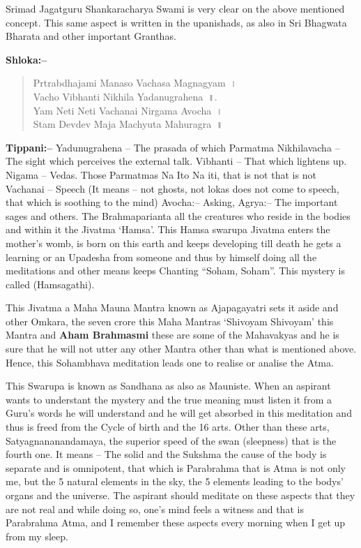 Srimad Jagatguru Shankaracharya Swami is very clear on the above mentioned concept. This same aspect is written in the upanishads, as also in Sri Bhagwata Bharata and other important Granthas.

\textbf{Shloka:–}

\begin{verse}
 Prtrabdhajami Manaso Vachasa Magnagyam~।\\
 Vacho Vibhanti Nikhila Yadanugrahena~॥.\\
 Yam Neti Neti Vachanai Nirgama Avocha~।\\
 Stam Devdev Maja Machyuta Mahuragra~॥
\end{verse}

\textbf{Tippani:–} Yadunugrahena – The prasada of which Parmatma Nikhilavacha – The sight which perceives the external talk. Vibhanti – That which lightens up. Nigama – Vedas. Those Parmatmas Na Ito Na iti, that is not that is not Vachanai – Speech (It means – not ghosts, not lokas does not come to speech, that which is soothing to the mind) Avocha:– Asking, Agrya:– The important sages and others. The Brahmaparianta all the creatures who reside in the bodies and within it the Jivatma ‘Hamsa’. This Hamsa swarupa Jivatma enters the mother's womb, is born on this earth and keeps developing till death he gets a learning or an Upadesha from someone and thus by himself doing all the meditations and other means keeps Chanting “Soham, Soham”. This mystery is called (Hamsagathi).

This Jivatma a Maha Mauna Mantra known as Ajapagayatri sets it aside and other Omkara, the seven crore this Maha Mantras ‘Shivoyam Shivoyam’ this Mantra and \textbf{Aham Brahmasmi} these are some of the Mahavakyas and he is sure that he will not utter any other Mantra other than what is mentioned above. Hence, this Sohambhava meditation leads one to realise or analise the Atma.

This Swarupa is known as Sandhana as also as Mauniste. When an aspirant wants to understant the mystery and the true meaning must listen it from a Guru's words he will understand and he will get absorbed in this meditation and thus is freed from the Cycle of birth and the 16 arts. Other than these arts, Satyagnananandamaya, the superior speed of the swan (sleepness) that is the fourth one. It means – The solid and the Sukshma the cause of the body is separate and is omnipotent, that which is Parabrahma that is Atma is not only me, but the 5 natural elements in the sky, the 5 elements leading to the bodys' organs and the universe. The aspirant should meditate on these aspects that they are not real and while doing so, one's mind feels a witness and that is Parabrahma Atma, and I remember these aspects every morning when I get up from my sleep.

